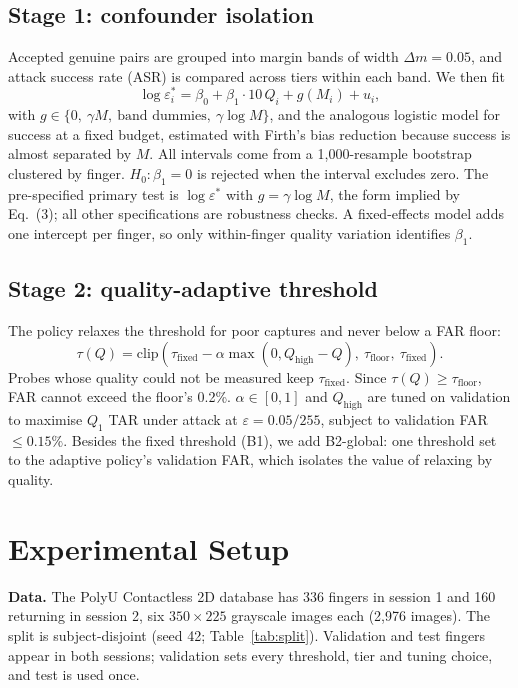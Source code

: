 \documentclass[10pt,twocolumn,letterpaper]{article}
\newcommand{\eps}{\varepsilon}
\newcommand{\taufix}{\tau_{\mathrm{fixed}}}
\newcommand{\taufloor}{\tau_{\mathrm{floor}}}
\begin{document}
\subsection{Stage 1: confounder isolation}
Accepted genuine pairs are grouped into margin bands of width $\Delta m = 0.05$, and attack success rate (ASR) is compared across tiers within each band. We then fit
\begin{equation}
\log \eps^*_i = \beta_0 + \beta_1 \cdot 10\,Q_i + g(M_i) + u_i ,
\end{equation}
with $g \in \{0,\ \gamma M,\ \text{band dummies},\ \gamma \log M\}$, and the analogous logistic model for success at a fixed budget, estimated with Firth's bias reduction \cite{firth1993} because success is almost separated by $M$. All intervals come from a 1{,}000-resample bootstrap \cite{efron1993} clustered by finger. $H_0: \beta_1 = 0$ is rejected when the interval excludes zero. The pre-specified primary test is $\log \eps^*$ with $g = \gamma \log M$, the form implied by Eq.~(3); all other specifications are robustness checks. A fixed-effects model adds one intercept per finger, so only within-finger quality variation identifies $\beta_1$.

\subsection{Stage 2: quality-adaptive threshold}
The policy relaxes the threshold for poor captures and never below a FAR floor:
\begin{equation}
\tau(Q) = \mathrm{clip}\!\left(\taufix - \alpha\max(0, Q_{\mathrm{high}} - Q),\ \taufloor,\ \taufix\right).
\end{equation}
Probes whose quality could not be measured keep $\taufix$. Since $\tau(Q) \ge \taufloor$, FAR cannot exceed the floor's 0.2\%. $\alpha \in [0,1]$ and $Q_{\mathrm{high}}$ are tuned on validation to maximise $Q_1$ TAR under attack at $\eps = 0.05/255$, subject to validation FAR $\le 0.15\%$. Besides the fixed threshold (B1), we add B2-global: one threshold set to the adaptive policy's validation FAR, which isolates the value of relaxing by quality.

\section{Experimental Setup}
\textbf{Data.} The PolyU Contactless 2D database \cite{polyu} has 336 fingers in session 1 and 160 returning in session 2, six $350\times225$ grayscale images each (2{,}976 images). The split is subject-disjoint (seed 42; Table~\ref{tab:split}). Validation and test fingers appear in both sessions; validation sets every threshold, tier and tuning choice, and test is used once.
\end{document}

